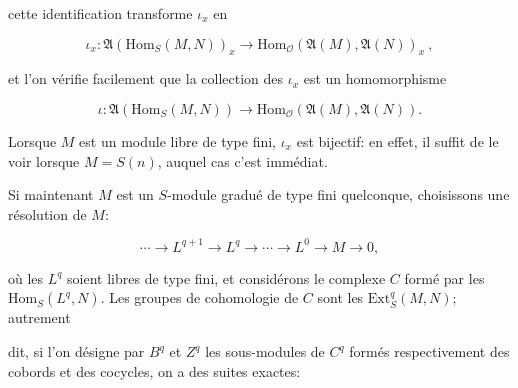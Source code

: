 cette identification transforme $\iota_x$ en

\begin{equation*}
\iota_x : \mathfrak{A}(\mathrm{Hom}_S(M, N))_x \longrightarrow \mathrm{Hom}_{\mathcal{O}}(\mathfrak{A}(M), \mathfrak{A}(N))_x \ ,
\end{equation*}

et l'on vérifie facilement que la collection des $\iota_x$ est un homomorphisme

\begin{equation*}
\iota : \mathfrak{A}(\mathrm{Hom}_S(M, N)) \longrightarrow \mathrm{Hom}_{\mathcal{O}}(\mathfrak{A}(M), \mathfrak{A}(N)).
\end{equation*}

Lorsque $M$ est un module libre de type fini, $\iota_x$ est bijectif: en effet, il suffit de le voir lorsque $M = S(n)$, auquel cas c'est immédiat.

Si maintenant $M$ est un $S$-module gradué de type fini quelconque, choisissons une résolution de $M$:

\begin{equation*}
\cdots \rightarrow L^{q+1} \rightarrow L^q \rightarrow \cdots \rightarrow L^0 \rightarrow M \rightarrow 0,
\end{equation*}

où les $L^q$ soient libres de type fini, et considérons le complexe $C$ formé par les $\mathrm{Hom}_S(L^q, N)$. Les groupes de cohomologie de $C$ sont les $\mathrm{Ext}_S^q(M, N)$; autrement



%
%
%
dit, si l'on désigne par $B^q$ et $Z^q$ les sous-modules de $C^q$ formés respectivement des cobords et des cocycles, on a des suites exactes:

